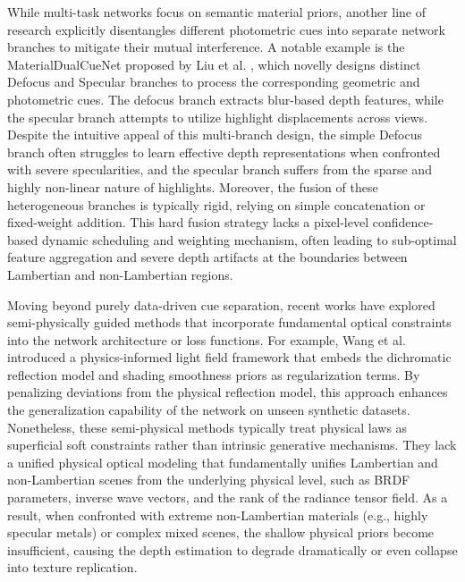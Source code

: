 \documentclass[journal]{IEEEtran}
\begin{document}
While multi-task networks focus on semantic material priors, another line of research explicitly disentangles different photometric cues into separate network branches to mitigate their mutual interference. A notable example is the MaterialDualCueNet proposed by Liu et al. , which novelly designs distinct Defocus and Specular branches to process the corresponding geometric and photometric cues. The defocus branch extracts blur-based depth features, while the specular branch attempts to utilize highlight displacements across views. Despite the intuitive appeal of this multi-branch design, the simple Defocus branch often struggles to learn effective depth representations when confronted with severe specularities, and the specular branch suffers from the sparse and highly non-linear nature of highlights. Moreover, the fusion of these heterogeneous branches is typically rigid, relying on simple concatenation or fixed-weight addition. This hard fusion strategy lacks a pixel-level confidence-based dynamic scheduling and weighting mechanism, often leading to sub-optimal feature aggregation and severe depth artifacts at the boundaries between Lambertian and non-Lambertian regions.

Moving beyond purely data-driven cue separation, recent works have explored semi-physically guided methods that incorporate fundamental optical constraints into the network architecture or loss functions. For example, Wang et al.  introduced a physics-informed light field framework that embeds the dichromatic reflection model and shading smoothness priors as regularization terms. By penalizing deviations from the physical reflection model, this approach enhances the generalization capability of the network on unseen synthetic datasets. Nonetheless, these semi-physical methods typically treat physical laws as superficial soft constraints rather than intrinsic generative mechanisms. They lack a unified physical optical modeling that fundamentally unifies Lambertian and non-Lambertian scenes from the underlying physical level, such as BRDF parameters, inverse wave vectors, and the rank of the radiance tensor field. As a result, when confronted with extreme non-Lambertian materials (e.g., highly specular metals) or complex mixed scenes, the shallow physical priors become insufficient, causing the depth estimation to degrade dramatically or even collapse into texture replication.
\end{document}
